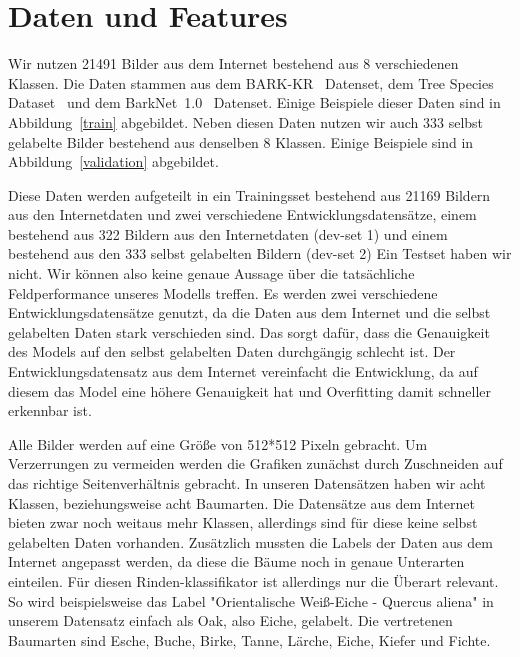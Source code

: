 \documentclass{article}
\begin{document}
\section{Daten und Features}

Wir nutzen 21491 Bilder aus dem Internet bestehend aus 8 verschiedenen Klassen.
Die Daten stammen aus dem BARK-KR~\cite{2_BARK-KR} Datenset, 
dem Tree Species Dataset~\cite{3_Tree_species} 
und dem BarkNet~1.0~\cite{4_barkNet} Datenset. 
Einige Beispiele dieser Daten sind in Abbildung~\ref{train} abgebildet. 
Neben diesen Daten nutzen wir auch 333 selbst gelabelte Bilder bestehend aus denselben 8 Klassen.
Einige Beispiele sind in Abbildung~\ref{validation} abgebildet.

Diese Daten werden aufgeteilt in ein Trainingsset bestehend aus 21169 Bildern aus den Internetdaten
und zwei verschiedene Entwicklungsdatensätze,
einem bestehend aus 322 Bildern aus den Internetdaten (dev-set 1) 
und einem bestehend aus den 333 selbst gelabelten Bildern (dev-set 2)
Ein Testset haben wir nicht. 
Wir können also keine genaue Aussage über die tatsächliche Feldperformance unseres Modells treffen. 
Es werden zwei verschiedene Entwicklungsdatensätze genutzt, 
da die Daten aus dem Internet und die selbst gelabelten Daten stark verschieden sind.
Das sorgt dafür, dass die Genauigkeit des Models auf den selbst gelabelten Daten durchgängig schlecht ist.
Der Entwicklungsdatensatz aus dem Internet vereinfacht die Entwicklung,
da auf diesem das Model eine höhere Genauigkeit hat und Overfitting damit schneller erkennbar ist.

Alle Bilder werden auf eine Grö\ss e von 512*512 Pixeln gebracht. Um Verzerrungen zu vermeiden werden die Grafiken zunächst durch Zuschneiden auf das richtige Seitenverhältnis gebracht. In unseren Datensätzen haben wir acht Klassen, beziehungsweise acht Baumarten. 
Die Datensätze aus dem Internet bieten zwar noch weitaus mehr Klassen, allerdings sind für diese keine selbst gelabelten Daten vorhanden. 
Zusätzlich mussten die Labels der Daten aus dem Internet angepasst werden,
da diese die Bäume noch in genaue Unterarten einteilen.
Für diesen Rinden-klassifikator ist allerdings nur die Überart relevant. 
So wird beispielsweise das Label "Orientalische Wei\ss -Eiche - Quercus aliena" in unserem Datensatz einfach als Oak, also Eiche, gelabelt. 
Die vertretenen Baumarten sind Esche, Buche, Birke, Tanne, Lärche, Eiche, Kiefer und Fichte.
\end{document}
